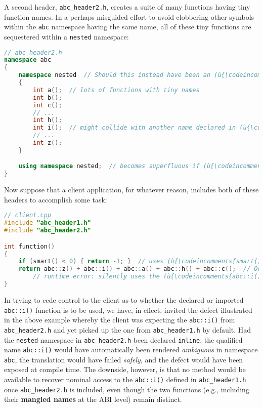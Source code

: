 \noindent A second header, \texttt{abc\_header2.h}, creates a suite of many
functions having tiny function names. In a perhaps misguided effort to
avoid clobbering other symbols within the \texttt{abc} namespace having
the same name, all of these tiny functions are sequestered within a
\texttt{nested} namespace:

\begin{lstlisting}[language=C++]
// abc_header2.h
namespace abc
{
    namespace nested  // Should this instead have been an (ù{\codeincomments{inline}}ù) namespace?
    {
        int a();  // lots of functions with tiny names
        int b();
        int c();
        // ...
        int h();
        int i();  // might collide with another name declared in (ù{\codeincomments{abc}}ù)
        // ...
        int z();
    }

    using namespace nested;  // becomes superfluous if (ù{\codeincomments{nested}}ù) is made (ù{\codeincomments{inline}}ù)
}
\end{lstlisting}

\noindent Now suppose that a client application, for whatever reason, includes
both of these headers to accomplish some task:

\begin{lstlisting}[language=C++]
// client.cpp
#include "abc_header1.h"
#include "abc_header2.h"

int function()
{
    if (smart() < 0) { return -1; }  // uses (ù{\codeincomments{smart()}}ù) from (ù{\codeincomments{abc\_header1.h}}ù)
    return abc::z() + abc::i() + abc::a() + abc::h() + abc::c();  // Oops!
        // runtime error: silently uses the (ù{\codeincomments{abc::i()}}ù) defined in (ù{\codeincomments{abc\_header1.h}}ù)
}
\end{lstlisting}

\noindent In trying to cede control to the client as to whether the declared or
imported \texttt{abc::i()} function is to be used, we have, in effect,
invited the defect illustrated in the above example whereby the client
was expecting the \texttt{abc::i()} from \texttt{abc\_header2.h} and yet
picked up the one from \texttt{abc\_header1.h} by default. Had the
\texttt{nested} namespace in \texttt{abc\_header2.h} been declared
\texttt{inline}, the qualified name \texttt{abc::i()} would have
automatically been rendered \emph{ambiguous} in namespace \texttt{abc},
the translation would have failed \emph{safely}, and the defect would
have been exposed at compile time. The downside, however, is that no
method would be available to recover nominal access to the
\texttt{abc::i()} defined in \texttt{abc\_header1.h} once
\texttt{abc\_header2.h} is included, even though the two functions
(e.g., including their \textbf{mangled names} at the ABI level) remain
distinct.

